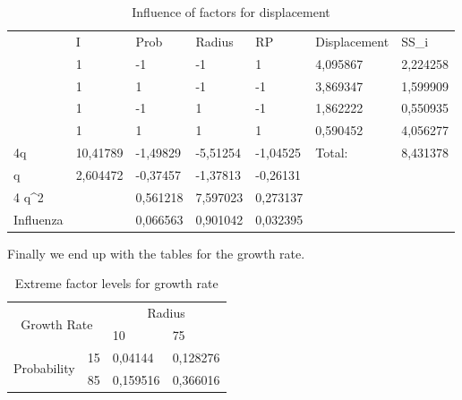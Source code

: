 \begin{table}[H] \label{tab:Displacement}
\centering
\begin{tabular}{l|l|l|l|l|ll}
\cline{2-7}
 & I & Prob & Radius & RP & \multicolumn{1}{l|}{Displacement} & \multicolumn{1}{l|}{SS\_i} \\ \cline{2-7} 
 & 1 & -1 & -1 & 1 & \multicolumn{1}{l|}{4,095867} & \multicolumn{1}{l|}{2,224258} \\ \cline{2-7} 
 & 1 & 1 & -1 & -1 & \multicolumn{1}{l|}{3,869347} & \multicolumn{1}{l|}{1,599909} \\ \cline{2-7} 
 & 1 & -1 & 1 & -1 & \multicolumn{1}{l|}{1,862222} & \multicolumn{1}{l|}{0,550935} \\ \cline{2-7} 
 & 1 & 1 & 1 & 1 & \multicolumn{1}{l|}{0,590452} & \multicolumn{1}{l|}{4,056277} \\ \hline \multicolumn{1}{|l|}{4q} & 10,41789 & -1,49829 & -5,51254 & -1,04525 & \multicolumn{1}{l|}{Total:} & \multicolumn{1}{l|}{8,431378} \\ \hline
\multicolumn{1}{|l|}{q} & 2,604472 & -0,37457 & -1,37813 & -0,26131 &  &  \\ \cline{1-5}
\multicolumn{1}{|l|}{4 q\textasciicircum{}2} &  & 0,561218 & 7,597023 & 0,273137 &  &  \\ \cline{1-5}
\multicolumn{1}{|l|}{Influenza} &  & 0,066563 & 0,901042 & 0,032395 &  &  \\ \cline{1-5}
\end{tabular}
\caption{Influence of factors for displacement}
\end{table}

Finally we end up with the tables for the growth rate.

\begin{table}[H]
\centering
\begin{tabular}{|cl|ll|}
\hline
\multicolumn{2}{|c|}{\multirow{2}{*}{Growth Rate}} & \multicolumn{2}{c|}{Radius} \\ \cline{3-4} 
\multicolumn{2}{|c|}{} & \multicolumn{1}{l|}{10} & 75 \\ \hline
\multicolumn{1}{|c|}{\multirow{2}{*}{Probability}} & 15 & \multicolumn{1}{l|}{0,04144} & 0,128276 \\ \cline{2-4} 
\multicolumn{1}{|c|}{} & 85 & \multicolumn{1}{l|}{0,159516} & 0,366016 \\ \hline
\end{tabular}
\caption{Extreme factor levels for growth rate}
\end{table}


